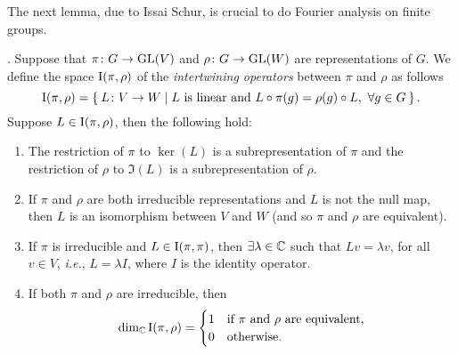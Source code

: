 The next lemma, due to Issai Schur, is crucial to do Fourier analysis on finite groups.

\begin{lemma}.
Suppose that $\pi\colon G\rightarrow \operatorname{GL}(V)$ and $\rho\colon G\rightarrow \operatorname{GL}(W)$ are representations of $G$. We define the space $\operatorname{I}(\pi,\rho)$ of the \emph{intertwining operators} between $\pi$ and $\rho$ as follows
\[
\operatorname{I}(\pi,\rho)=\Set{L\colon V\rightarrow W | L \text{ is linear and } L\circ \pi(g)= \rho(g)\circ L , \ \forall g\in G}.
\]
Suppose $L\in \operatorname{I}(\pi,\rho)$, then the following hold:
\begin{enumerate}
\item The restriction of $\pi$ to $\ker(L)$ is a subrepresentation of $\pi$ and  the restriction of $\rho$ to $\Im(L)$ is a subrepresentation of $\rho$.
\item If $\pi$ and $\rho$ are both irreducible representations and $L$ is not the null map, then $L$ is an isomorphism between $V$ and $W$ (and so $\pi$ and $\rho$ are equivalent).
\item If $\pi$ is irreducible and $L\in \operatorname{I}(\pi,\pi)$,  then $\exists \lambda \in {\mathbb C}$ such that $Lv=\lambda v$, for all $v\in V$, \emph{i.e.}, $L=\lambda I$, where $I$ is the identity operator.
\item If both $\pi$ and $\rho$ are irreducible, then 
\[
\dim_{\mathbb C}\operatorname{I}(\pi, \rho)=
\begin{cases}
1 &\text{if $\pi$ and $\rho$ are equivalent,} \\
0 &\text{otherwise.}
\end{cases}
\]
\end{enumerate}
\end{lemma}
